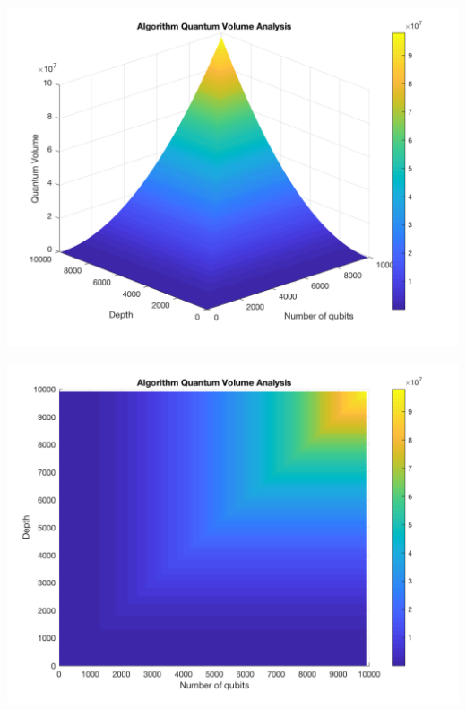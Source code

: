 \begin{itemize}
\begin{itemize}
\begin{itemize}
\begin{minipage}{.45\textwidth}
\begin{center}
\includegraphics[width=.9\linewidth]{figures/V_q_analysis_sym2.png}
\end{center}

\label{fig:algorithmQV2sym}

\end{minipage}%
\hspace{1cm}
\begin{minipage}{.45\textwidth}

\begin{center}
\includegraphics[width=.9\linewidth]{figures/V_q_analysis_sym1.png}
\end{center}

\label{fig:algorithmQV1sym}

\end{minipage}%


\end{itemize}
\end{itemize}
\end{itemize}
